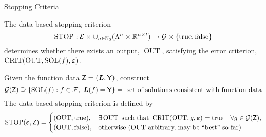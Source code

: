 \documentclass[10pt,compress,xcolor={usenames,dvipsnames},aspectratio=169]{beamer}
\DeclareMathOperator{\STOP}{STOP}
\DeclareMathOperator{\SOL}{SOL}
\DeclareMathOperator{\OUT}{OUT}
\DeclareMathOperator{\CRIT}{CRIT}
\newcommand{\ttrue}{\text{true}}
\newcommand{\tfalse}{\text{false}}
\begin{document}
\begin{frame}{Stopping Criteria}

\vspace{-5ex}
The \alert{data based} stopping criterion
\[
\STOP:  \ce  \times \cup_{n \in \natzero} (\Lambda^n \times \reals^{n\times t} ) \to \cg \times \{\ttrue, \tfalse \}
\]
determines whether there exists an output, $\OUT$, satisfying the error criterion, $\CRIT(\OUT,\SOL(f),\veps)$.   

Given the function data $\mathsf{Z} = (\boldsymbol{L},\mathsf{Y})$,  construct 
\[
\cg(\mZ) \supseteq \{\SOL(f) :   f \in \cf, \ \vL(f) = \mY   \} = \text{ set of solutions consistent with function data}
\]
The data based stopping criterion is defined by
\[
\STOP(\veps,\mZ) = \begin{cases} 
	(\OUT,\ttrue), & 
	\exists \OUT \text{ such that } \CRIT(\OUT,g,\veps) = \ttrue \quad \forall g \in \cg(\mZ), \\
	(\OUT,\tfalse), & \text{otherwise ($\OUT$ arbitrary, may be ``best'' so far)}
	\end{cases}
\]

\end{frame}
\end{document}
